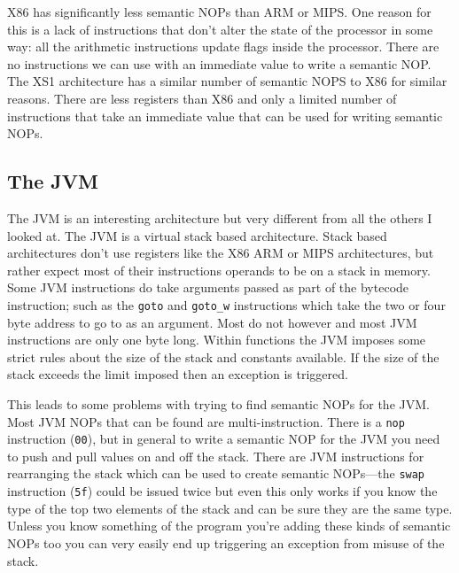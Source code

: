 \documentclass[10pt,]{book}
\begin{document}
X86 has significantly less semantic NOPs than ARM or MIPS. One reason
for this is a lack of instructions that don't alter the state of the
processor in some way: all the arithmetic instructions update flags
inside the processor. There are no instructions we can use with an
immediate value to write a semantic NOP. The XS1 architecture has a
similar number of semantic NOPS to X86 for similar reasons. There are
less registers than X86 and only a limited number of instructions that
take an immediate value that can be used for writing semantic NOPs.

\subsection{The JVM}

The JVM is an interesting architecture but very different from all the
others I looked at. The JVM is a virtual stack based
architecture\autocite{Lindholm:2012wy}. Stack based architectures don't
use registers like the X86 ARM or MIPS architectures, but rather expect
most of their instructions operands to be on a stack in memory. Some JVM
instructions do take arguments passed as part of the bytecode
instruction; such as the \lstinline!goto! and \lstinline!goto_w!
instructions which take the two or four byte address to go to as an
argument. Most do not however and most JVM instructions are only one
byte long. Within functions the JVM imposes some strict rules about the
size of the stack and constants available. If the size of the stack
exceeds the limit imposed then an exception is triggered.

This leads to some problems with trying to find semantic NOPs for the
JVM. Most JVM NOPs that can be found are multi-instruction. There is a
\lstinline!nop! instruction (\lstinline!00!), but in general to write a
semantic NOP for the JVM you need to push and pull values on and off the
stack. There are JVM instructions for rearranging the stack which can be
used to create semantic NOPs---the \lstinline!swap! instruction
(\lstinline!5f!) could be issued twice but even this only works if you
know the type of the top two elements of the stack and can be sure they
are the same type. Unless you know something of the program you're
adding these kinds of semantic NOPs too you can very easily end up
triggering an exception from misuse of the stack.
\end{document}
